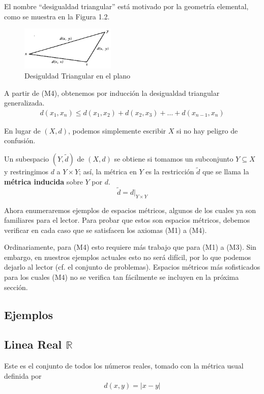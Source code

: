 {El nombre ``desigualdad triangular'' está motivado por la geometría elemental, como se muestra en la Figura 1.2.

\begin{figure}[H]
    \centering
    \includegraphics[width=0.4\textwidth]{img/metricSpace/2.png}
    \caption{Desiguldad Triangular en el plano}
\end{figure}
\newpage

A partir de (M4), obtenemos por inducción la desigualdad triangular generalizada. 
\begin{align}
    d(x_1,x_n)\leq d(x_1,x_2)+d(x_2,x_3)+\dots+d(x_{n-1},x_n)
\end{align}

En lugar de \((X, d)\), podemos simplemente escribir \(X\) si no hay peligro de confusión.

Un subespacio \((Y, \tilde{d})\) de \((X, d)\) se obtiene si tomamos un subconjunto \(Y \subseteq X\) y restringimos \(d\) a \(Y \times Y\); así, la métrica en \(Y\) es la restricción \(\tilde{d}\) que se llama la \textbf{métrica inducida} sobre \(Y\) por \(d\).
\[\tilde{d} = d|_{Y\times Y}\]

Ahora enumeraremos ejemplos de espacios métricos, algunos de los cuales ya son familiares para el lector. Para probar que estos son espacios métricos, debemos verificar en cada caso que se satisfacen los axiomas (M1) a (M4). 

Ordinariamente, para (M4) esto requiere más trabajo que para (M1) a (M3). Sin embargo, en nuestros ejemplos actuales esto no será difícil, por lo que podemos dejarlo al lector (cf. el conjunto de problemas). 
Espacios métricos más sofisticados para los cuales (M4) no se verifica tan fácilmente se incluyen en la próxima sección.

\subsection*{Ejemplos}

\subsection{Linea Real \texorpdfstring{$\mathbb{R}$}{R} }
Este es el conjunto de todos los números reales, tomado con la métrica usual definida por
\begin{align}
    d(x, y) = |x - y|
\end{align}
}

